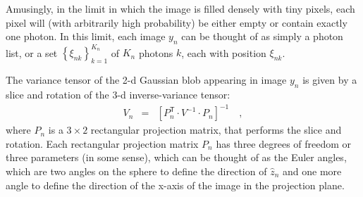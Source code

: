 \documentclass[12pt]{article}
\newcommand{\unitvec}[1]{\hat{#1}}
\newcommand{\zhat}{\unitvec{z}}
\newcommand{\transpose}{^{\mathsf{T}}}
\newcommand{\setof}[1]{\left\{{#1}\right\}}
\begin{document}
Amusingly, in the limit in which the image is filled densely with
tiny pixels, each pixel will (with arbitrarily high probability) be
either empty or contain exactly one photon.
In this limit, each image $y_n$ can be thought of as simply a photon
list, or a set $\setof{\xi_{nk}}_{k=1}^{K_n}$ of $K_n$ photons $k$,
each with position $\xi_{nk}$.

The variance tensor of the 2-d Gaussian blob appearing in image $y_n$
is given by a slice and rotation of the 3-d inverse-variance tensor:
\begin{eqnarray}
  V_n &=& [P_n\transpose\cdot V^{-1}\cdot P_n]^{-1}
  \quad ,
\end{eqnarray}
where $P_n$ is a $3\times 2$ rectangular projection matrix, that
performs the slice and rotation.
Each rectangular projection matrix $P_n$ has three degrees of freedom or three
parameters (in some sense), which can be thought of as the Euler
angles, which are two angles on the sphere to define the direction of
$\zhat_n$ and one more angle to define the direction of the x-axis of
the image in the projection plane.
\end{document}
